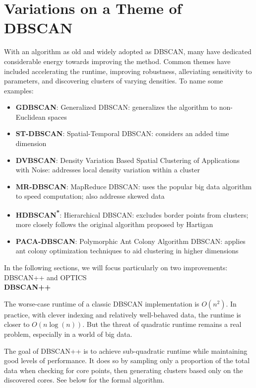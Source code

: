 \section{Variations on a Theme of DBSCAN}

With an algorithm as old and widely adopted as DBSCAN, many have dedicated considerable energy towards improving the method. Common themes have included accelerating the runtime, improving robustness, alleviating sensitivity to parameters, and discovering clusters of varying densities. To name some examples:\cite{dbscan_improvs}

\begin{itemize}
    \item \textbf{GDBSCAN}: Generalized DBSCAN: generalizes the algorithm to non-Euclidean spaces
    \item \textbf{ST-DBSCAN}: Spatial-Temporal DBSCAN: considers an added time dimension
    \item \textbf{DVBSCAN}: Density Variation Based Spatial Clustering of Applications with Noise: addresses local density variation within a cluster
    \item \textbf{MR-DBSCAN}: MapReduce DBSCAN: uses the popular big data algorithm to speed computation; also addresse skewed data
    \item \textbf{HDBSCAN\textsuperscript{*}}: Hierarchical DBSCAN: excludes border points from clusters; more closely follows the original algorithm proposed by Hartigan
    \item \textbf{PACA-DBSCAN}: Polymorphic Ant Colony Algorithm DBSCAN: applies ant colony optimization techniques to aid clustering in higher dimensions
\end{itemize}

In the following sections, we will focus particularly on two improvements: DBSCAN++ and OPTICS \\

\noindent\textbf{DBSCAN++}

The worse-case runtime of a classic DBSCAN implementation is $O(n^2)$. In practice, with clever indexing and relatively well-behaved data, the runtime is closer to $O(n \log(n))$. But the threat of quadratic runtime remains a real problem, especially in a world of big data.

The goal of DBSCAN++ is to achieve sub-quadratic runtime while maintaining good levels of performance. It does so by sampling only a proportion of the total data when checking for core points, then generating clusters based only on the discovered cores. See below for the formal algorithm.\cite{dbscanpp}

